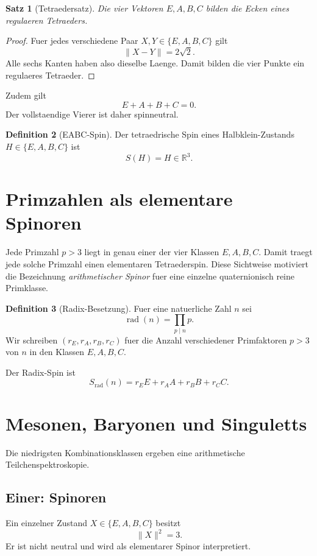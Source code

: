 \documentclass[11pt,a4paper]{article}
\newtheorem{satz}{Satz}[section]
\theoremstyle{definition}
\newtheorem{definition}[satz]{Definition}
\theoremstyle{remark}
\DeclareMathOperator{\rad}{rad}
\newcommand{\R}{\mathbb R}
\begin{document}
\begin{satz}[Tetraedersatz]
Die vier Vektoren \(E,A,B,C\) bilden die Ecken eines regulaeren Tetraeders.
\end{satz}

\begin{proof}
Fuer jedes verschiedene Paar \(X,Y\in\{E,A,B,C\}\) gilt
\[
\|X-Y\|=2\sqrt2.
\]
Alle sechs Kanten haben also dieselbe Laenge. Damit bilden die vier Punkte ein
regulaeres Tetraeder.
\end{proof}

Zudem gilt
\[
E+A+B+C=0.
\]
Der vollstaendige Vierer ist daher spinneutral.

\begin{definition}[EABC-Spin]
Der tetraedrische Spin eines Halbklein-Zustands \(H\in\{E,A,B,C\}\) ist
\[
S(H)=H\in\R^3.
\]
\end{definition}

\section{Primzahlen als elementare Spinoren}

Jede Primzahl \(p>3\) liegt in genau einer der vier Klassen \(E,A,B,C\). Damit
traegt jede solche Primzahl einen elementaren Tetraederspin. Diese Sichtweise
motiviert die Bezeichnung \emph{arithmetischer Spinor} fuer eine einzelne
quaternionisch reine Primklasse.

\begin{definition}[Radix-Besetzung]
Fuer eine natuerliche Zahl \(n\) sei
\[
\rad(n)=\prod_{p\mid n}p.
\]
Wir schreiben \((r_E,r_A,r_B,r_C)\) fuer die Anzahl verschiedener Primfaktoren
\(p>3\) von \(n\) in den Klassen \(E,A,B,C\).
\end{definition}

Der Radix-Spin ist
\[
S_{\rad}(n)=r_EE+r_AA+r_BB+r_CC.
\]

\section{Mesonen, Baryonen und Singuletts}

Die niedrigsten Kombinationsklassen ergeben eine arithmetische
Teilchenspektroskopie.

\subsection{Einer: Spinoren}

Ein einzelner Zustand \(X\in\{E,A,B,C\}\) besitzt
\[
\|X\|^2=3.
\]
Er ist nicht neutral und wird als elementarer Spinor interpretiert.
\end{document}
